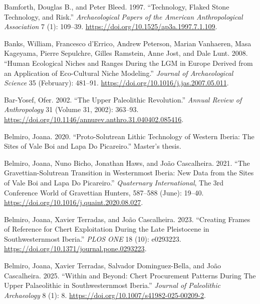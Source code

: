 \documentclass[
  a4paper,
  DIV=11,
  numbers=noendperiod]{scrreprt}
\newlength{\cslhangindent}
\newenvironment{CSLReferences}[2] %
 {\begin{list}{}{%
  \setlength{\itemindent}{0pt}
  \setlength{\leftmargin}{0pt}
  \setlength{\parsep}{0pt}
  \ifodd #1
   \setlength{\leftmargin}{\cslhangindent}
   \setlength{\itemindent}{-1\cslhangindent}
  \fi
  \setlength{\itemsep}{#2\baselineskip}}}
 {\end{list}}
\begin{document}
\begin{CSLReferences}{1}{0}
Bamforth, Douglas B., and Peter Bleed. 1997. {``Technology, {Flaked
Stone Technology}, and {Risk}.''} \emph{Archaeological Papers of the
American Anthropological Association} 7 (1): 109--39.
\url{https://doi.org/10.1525/ap3a.1997.7.1.109}.

Banks, William, Francesco d'Errico, Andrew Peterson, Marian Vanhaeren,
Masa Kageyama, Pierre Sepulchre, Gilles Ramstein, Anne Jost, and Dale
Lunt. 2008. {``Human Ecological Niches and Ranges During the {LGM} in
{Europe} Derived from an Application of Eco-Cultural Niche Modeling.''}
\emph{Journal of Archaeological Science} 35 (February): 481--91.
\url{https://doi.org/10.1016/j.jas.2007.05.011}.

Bar-Yosef, Ofer. 2002. {``The Upper Paleolithic Revolution.''}
\emph{Annual Review of Anthropology} 31 (Volume 31, 2002): 363--93.
\url{https://doi.org/10.1146/annurev.anthro.31.040402.085416}.

Belmiro, Joana. 2020. {``Proto-{Solutrean} Lithic Technology of Western
{Iberia}: The Sites of {Vale Boi} and {Lapa} Do {Picareiro}.''} Master's
thesis.

Belmiro, Joana, Nuno Bicho, Jonathan Haws, and João Cascalheira. 2021.
{``The {Gravettian-Solutrean} Transition in Westernmost {Iberia}: {New}
Data from the Sites of {Vale Boi} and {Lapa} Do {Picareiro}.''}
\emph{Quaternary International}, The 3rd {Conference World} of
{Gravettian Hunters}, 587--588 (June): 19--40.
\url{https://doi.org/10.1016/j.quaint.2020.08.027}.

Belmiro, Joana, Xavier Terradas, and João Cascalheira. 2023. {``Creating
Frames of Reference for Chert Exploitation During the {Late Pleistocene}
in {Southwesternmost Iberia}.''} \emph{PLOS ONE} 18 (10): e0293223.
\url{https://doi.org/10.1371/journal.pone.0293223}.

Belmiro, Joana, Xavier Terradas, Salvador Dominguez-Bella, and João
Cascalheira. 2025. {``Within and {Beyond}: {Chert Procurement Patterns
During The Upper Palaeolithic} in {Southwesternmost Iberia}.''}
\emph{Journal of Paleolithic Archaeology} 8 (1): 8.
\url{https://doi.org/10.1007/s41982-025-00209-2}.


\end{CSLReferences}
\end{document}
